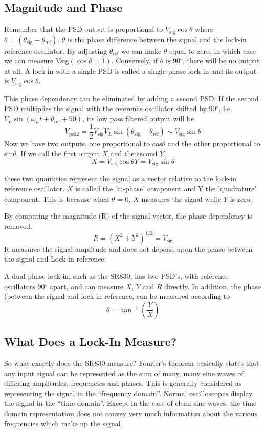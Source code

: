 \documentclass{../lab}
\begin{document}
\subsection{Magnitude and Phase}

Remember that the PSD output is proportional to $V_\text{sig} \cos \theta$ where $\theta = (\theta_\text{sig} - \theta_\text{ref})$. $\theta$ is the phase difference between the signal and the lock-in reference oscillator. By adjusting $\theta_\text{ref}$ we can make $\theta$ equal to zero, in which case we can measure Vsig$(\cos \theta = 1)$. Conversely, if $\theta$ is 90$^\circ$, there will be no output at all. A lock-in with a single PSD is called a single-phase lock-in and its output is $V_\text{sig} \cos \theta$.

This phase dependency can be eliminated by adding a second PSD. If the second PSD multiplies the signal with the reference oscillator shifted by 90$^\circ$, i.e. $V_L \sin(\omega_Lt + \theta_\text{ref} + 90)$, its low pass filtered output will be
\[
    V_\text{psd2} = \frac{1}{2} V_\text{sig} V_L \sin(\theta_\text{sig} - \theta_\text{ref}) \sim V_\text{sig} \sin \theta
\]
Now we have two outputs, one proportional to cos$\theta$ and the other proportional to sin$\theta$. If we call the first output $X$ and the second $Y$,
\[
    X = V_\text{sig} \cos \theta Y = V_\text{sig} \sin \theta
\]

these two quantities represent the signal as a vector relative to the lock-in reference oscillator. $X$ is called the 'in-phase' component and Y the 'quadrature' component. This is because when $\theta$ = 0, $X$ measures the signal while $Y$ is zero.

By computing the magnitude (R) of the signal vector, the phase dependency is removed.
\[
    R = (X^2 + Y^2)^{1/2} = V_\text{sig}
\]
R measures the signal amplitude and does not depend upon the phase between the signal and Lock-in reference.

A dual-phase lock-in, such as the SR830, has two PSD's, with reference oscillators 90$^\circ$ apart, and can measure $X$, $Y$ and $R$ directly. In addition, the phase (between the signal and lock-in reference, can be measured according to
\[
    \theta = \tan^{-1} \left(\frac{Y}{X} \right)
\]

\subsection{What Does a Lock-In Measure?}

So what exactly does the SR830 measure? Fourier's theorem basically states that any input signal can be represented as the sum of many, many sine waves of differing amplitudes, frequencies and phases. This is generally considered as representing the signal in the ``frequency domain''. Normal oscilloscopes display the signal in the ``time domain''. Except in the case of clean sine waves, the time domain representation does not convey very much information about the various frequencies which make up the signal.
\end{document}
